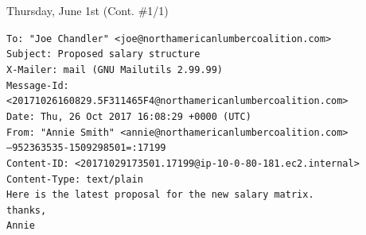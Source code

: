 \documentclass[11pt]{article}
\begin{document}
\begin{bloodorangebox}{Thursday, June 1st (Cont. \#1/1)\vspace{-2.2em}\begin{flushright}\large {}\end{flushright}}
\begin{itemize}
\begin{enumerate}
    \vspace{-1em}
\scriptsize{\texttt{To: "Joe Chandler" <joe@northamericanlumbercoalition.com> \\
Subject: Proposed salary structure \\
X-Mailer: mail (GNU Mailutils 2.99.99) \\
Message-Id: <20171026160829.5F311465F4@northamericanlumbercoalition.com> \\
Date: Thu, 26 Oct 2017 16:08:29 +0000 (UTC) \\
From: "Annie Smith" <annie@northamericanlumbercoalition.com>\\
--952363535-1509298501=:17199 \\
Content-ID: <20171029173501.17199@ip-10-0-80-181.ec2.internal> \\
Content-Type: text/plain\\
Here is the latest proposal for the new salary matrix. \\
thanks,\\
Annie}}
    \end{enumerate}
\end{itemize}
\end{bloodorangebox}

\begin{center}
\vspace{-0.25em}
\hspace{0.2cm}
\vspace{-0.4em}
\end{center}
\end{document}
